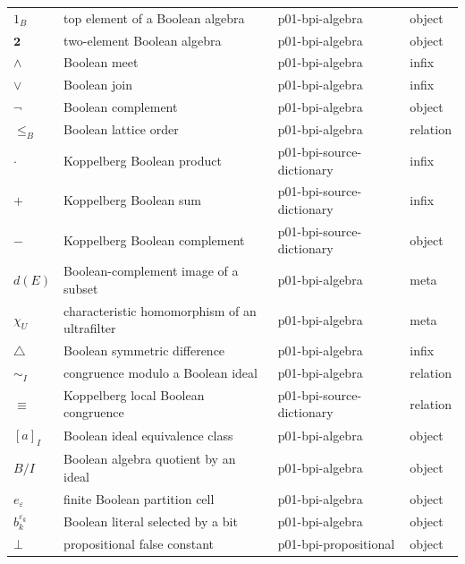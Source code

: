 \begin{longtable}{@{}p{}p{}p{}p{}@{}}
\(1_B\) & top element of a Boolean algebra & p01-\allowbreak{}bpi-\allowbreak{}algebra & object \\
\(\mathbf2\) & two-element Boolean algebra & p01-\allowbreak{}bpi-\allowbreak{}algebra & object \\
\(\wedge\) & Boolean meet & p01-\allowbreak{}bpi-\allowbreak{}algebra & infix \\
\(\vee\) & Boolean join & p01-\allowbreak{}bpi-\allowbreak{}algebra & infix \\
\(\neg\) & Boolean complement & p01-\allowbreak{}bpi-\allowbreak{}algebra & object \\
\(\leq_B\) & Boolean lattice order & p01-\allowbreak{}bpi-\allowbreak{}algebra & relation \\
\(\cdot\) & Koppelberg Boolean product & p01-\allowbreak{}bpi-\allowbreak{}source-\allowbreak{}dictionary & infix \\
\(+\) & Koppelberg Boolean sum & p01-\allowbreak{}bpi-\allowbreak{}source-\allowbreak{}dictionary & infix \\
\(-\) & Koppelberg Boolean complement & p01-\allowbreak{}bpi-\allowbreak{}source-\allowbreak{}dictionary & object \\
\(d(E)\) & Boolean-complement image of a subset & p01-\allowbreak{}bpi-\allowbreak{}algebra & meta \\
\(\chi_U\) & characteristic homomorphism of an ultrafilter & p01-\allowbreak{}bpi-\allowbreak{}algebra & meta \\
\(\triangle\) & Boolean symmetric difference & p01-\allowbreak{}bpi-\allowbreak{}algebra & infix \\
\(\sim_I\) & congruence modulo a Boolean ideal & p01-\allowbreak{}bpi-\allowbreak{}algebra & relation \\
\(\equiv\) & Koppelberg local Boolean congruence & p01-\allowbreak{}bpi-\allowbreak{}source-\allowbreak{}dictionary & relation \\
\([a]_I\) & Boolean ideal equivalence class & p01-\allowbreak{}bpi-\allowbreak{}algebra & object \\
\(B/I\) & Boolean algebra quotient by an ideal & p01-\allowbreak{}bpi-\allowbreak{}algebra & object \\
\(e_\varepsilon\) & finite Boolean partition cell & p01-\allowbreak{}bpi-\allowbreak{}algebra & object \\
\(b_k^{\varepsilon_k}\) & Boolean literal selected by a bit & p01-\allowbreak{}bpi-\allowbreak{}algebra & object \\
\(\bot\) & propositional false constant & p01-\allowbreak{}bpi-\allowbreak{}propositional & object \\

\end{longtable}
